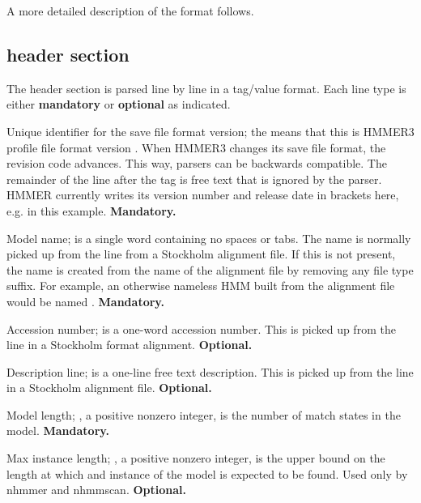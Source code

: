 A more detailed description of the format follows.

\subsection{header section}

The header section is parsed line by line in a tag/value format. Each
line type is either \textbf{mandatory} or \textbf{optional} as
indicated. 

\begin{sreitems}{}

\item [\monob{HMMER3/\HMMERfmtversion{}}] Unique identifier for the save file format
  version; the \mono{/\HMMERfmtversion{}} means that this is HMMER3 profile file format
  version \HMMERfmtversion{}. When HMMER3 changes its save file format, the revision
  code advances. This way, parsers can be backwards
  compatible. The remainder of the line after the  tag
  is free text that is ignored by the parser. HMMER currently writes
  its version number and release date in brackets here,
  e.g. \mono{\HMMERsavestamp{}} in this
  example. \textbf{Mandatory.}

\item [\monob{NAME <s>}] Model name;  is a single word
containing no spaces or tabs. The name is normally picked up from the
 line from a Stockholm alignment file.  If this is not
present, the name is created from the name of the alignment file by
removing any file type suffix. For example, an otherwise nameless HMM
built from the alignment file  would be named
.  \textbf{Mandatory.}

\item [\monob{ACC <s>}] Accession number;  is a one-word
accession number. This is picked up from the  line in a
Stockholm format alignment. \textbf{Optional.}

\item [\monob{DESC <s>}] Description line;  is a one-line
free text description. This is picked up from the  line
in a Stockholm alignment file. \textbf{Optional.}

\item [\monob{LENG <d>}] Model length; , a positive nonzero
integer, is the number of match states in the model.
\textbf{Mandatory.}

\item [\monob{MAXL <d>}] Max instance length; , a positive
nonzero integer, is the upper bound on the length at which and instance
of the model is expected to be found. Used only by nhmmer and nhmmscan.
\textbf{Optional.}


\end{sreitems}
